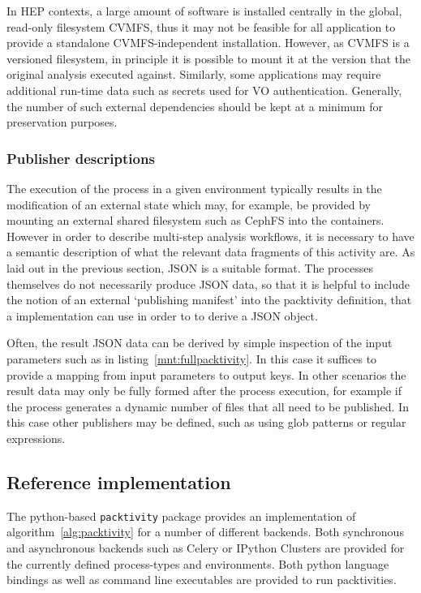 \documentclass[a4paper]{jpconf}
\begin{document}
In HEP contexts, a large amount of software is installed centrally in the global, read-only filesystem CVMFS, thus it may not be feasible for all application to provide a standalone CVMFS-independent installation. However, as CVMFS is a versioned filesystem, in principle it is possible to mount it at the version that the original analysis executed against. Similarly, some applications may require additional run-time data such as secrets used for VO authentication. Generally, the number of such external dependencies should be kept at a minimum for preservation purposes.

\subsubsection{Publisher descriptions}
The execution of the process in a given environment typically results in the modification of an external state which may, for example, be provided by mounting an external shared filesystem such as CephFS into the containers. However in order to describe multi-step analysis workflows, it is necessary to have a semantic description of what the relevant data fragments of this activity are. As laid out in the previous section, JSON is a suitable format. The processes themselves do not necessarily produce JSON data, so that it is helpful to include the notion of an external `publishing manifest' into the packtivity definition, that a implementation can use in order to to derive a JSON object. 

Often, the result JSON data can be derived by simple inspection of the input parameters such as in listing~\ref{mnt:fullpacktivity}. In this case it suffices to provide a mapping from input parameters to output keys. In other scenarios the result data may only be fully formed after the process execution, for example if the process generates a dynamic number of files that all need to be published. In this case other publishers may be defined, such as using glob patterns or regular expressions.

\subsection{Reference implementation}

The python-based \verb+packtivity+\cite{packtivity} package provides an implementation of algorithm~\ref{alg:packtivity} for a number of different backends. Both synchronous and asynchronous backends such as Celery or IPython Clusters are provided for the currently defined process-types and environments. Both python language bindings as well as command line executables are provided to run packtivities.
\end{document}
